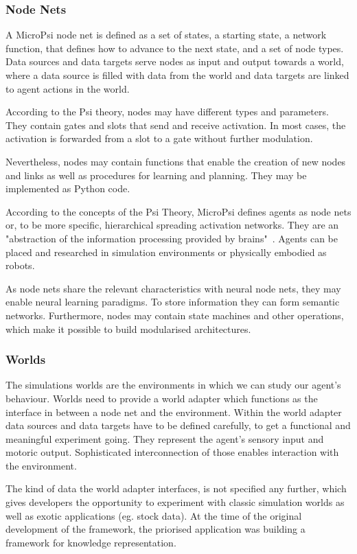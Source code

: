         \subsubsection{Node Nets}
A MicroPsi node net is defined as a set of states, a starting state, a network function, that defines how to advance to the next state, and a set of node types. Data sources and data targets serve nodes as input and output towards a world, where a data source is filled with data from the world and data targets are linked to agent actions in the world.

According to the Psi theory, nodes may have different types and parameters. They contain gates and slots that send and receive activation. In most cases, the activation is forwarded from a slot to a gate without further modulation.

Nevertheless, nodes may contain functions that enable the creation of new nodes and links as well as procedures for learning and planning. They may be implemented as Python code.

According to the concepts of the Psi Theory, MicroPsi defines agents as node nets or, to be more specific, hierarchical spreading activation networks. They are an "abstraction of the information processing provided by brains"~\cite{conf/agi/Bach12}. Agents can be placed and researched in simulation environments or physically embodied as robots.

As node nets share the relevant characteristics with neural node nets, they may enable neural learning paradigms. To store information they can form semantic networks. Furthermore, nodes may contain state machines and other operations, which make it possible to build modularised architectures.

        \subsubsection{Worlds}
The simulations worlds are the environments in which we can study our agent's behaviour. Worlds need to provide a world adapter which functions as the interface in between a node net and the environment. Within the world adapter data sources and data targets have to be defined carefully, to get a functional and meaningful experiment going. They represent the agent's sensory input and motoric output. Sophisticated interconnection of those enables interaction with the environment.

The kind of data the world adapter interfaces, is not specified any further, which gives developers the opportunity to experiment with classic simulation worlds as well as exotic applications (eg. stock data). At the time of the original development of the framework, the priorised application was building a framework for knowledge representation.


